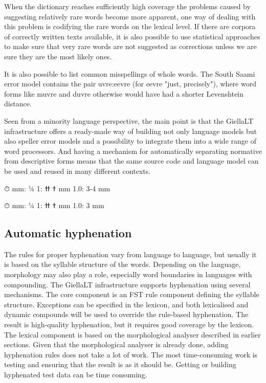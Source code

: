 \documentclass[free]{flammie}
\begin{document}
When the dictionary reaches sufficiently high coverage the problems caused by suggesting relatively rare words become more apparent, one way of dealing with this problem
is codifying the rare words on the lexical level. If there are corpora of correctly written
texts available, it is also possible to use statistical approaches to make sure that very rare
words are not suggested as corrections unless we are sure they are the most likely ones.

It is also possible to list common misspellings of whole words. The South Saami error
model contains the pair uvre:eevre (for eevre "just, precisely"), where word forms like
muvre and duvre otherwise would have had a shorter Levenshtein distance.

Seen from a minority language perspective, the main point is that the GiellaLT infrastructure offers a ready-made way of building not only language models but also speller
error models and a possibility to integrate them into a wide range of word processors. And
having a mechanism for automatically separating normative from descriptive forms means
that the same source code and language model can be used and reused in many different
contexts.

⏱
mm: ¼ ߙ
ߚ :1 mm
1.0: 3-4 mm

⏱
mm: ¼ ߙ
ߚ :1 mm
1.0: 3 mm

\subsection{Automatic hyphenation}

The rules for proper hyphenation vary from language to language, but usually it is based
on the syllable structure of the words. Depending on the language, morphology may also
play a role, especially word boundaries in languages with compounding.
The GiellaLT infrastructure supports hyphenation using several mechanisms. The core
component is an FST rule component defining the syllable structure. Exceptions can be
specified in the lexicon, and both lexicalised and dynamic compounds will be used to override the rule-based hyphenation. The result is high-quality hyphenation, but it requires good
coverage by the lexicon. The lexical component is based on the morphological analyser
described in earlier sections.
Given that the morphological analyser is already done, adding hyphenation rules does
not take a lot of work. The most time-consuming work is testing and ensuring that the result
is as it should be. Getting or building hyphenated test data can be time consuming.
\end{document}
